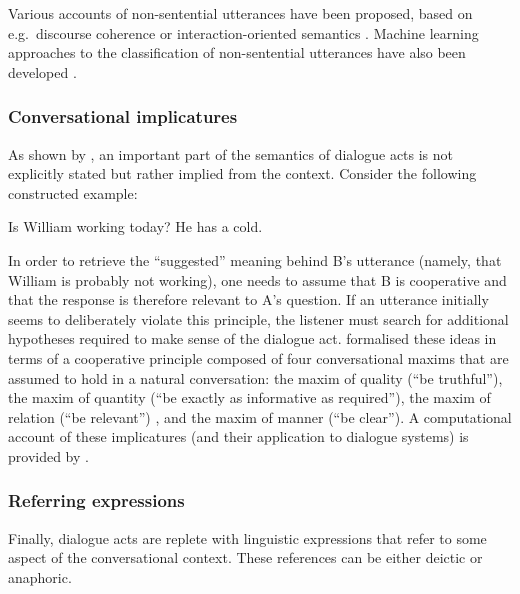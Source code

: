 Various accounts of non-sentential utterances have been proposed, based on e.g.\ discourse coherence \citep{Schlangen03theinterpretation} or interaction-oriented semantics \citep{fernandez2006non,Ginzburg2012}. Machine learning approaches to the classification of non-sentential utterances have also been developed \citep{Schlangen:2005,Fernandez:2007}. 


\subsubsection*{Conversational implicatures}
As shown by \cite{Grice1989}, an important part of the semantics of dialogue acts is not explicitly stated but rather implied from the context.  Consider the following constructed example: 
\begin{center}
\begin{dialogue}
 Is William working today?
 He has a cold.
\end{dialogue}
\end{center}
In order to retrieve the ``suggested'' meaning behind B's utterance (namely, that William is probably not working), one needs to assume that B is cooperative and that the response is therefore relevant to A's question.  If an utterance initially seems to deliberately violate this principle, the listener must search for additional hypotheses required to make sense of the dialogue act. \cite{Grice1989} formalised these ideas in terms of a cooperative principle composed of four conversational maxims that are assumed to hold in a natural conversation: the maxim of quality (``be truthful''), the maxim of quantity (``be exactly as informative as required''), the maxim of relation (``be relevant'') , and the maxim of manner (``be clear'').  A computational account of these implicatures (and their application to dialogue systems) is provided by \cite{benotti2010implicature}. 


\subsubsection*{Referring expressions}

Finally, dialogue acts are replete with linguistic expressions that refer to some aspect of the conversational context.  These references can be either deictic or anaphoric. 

